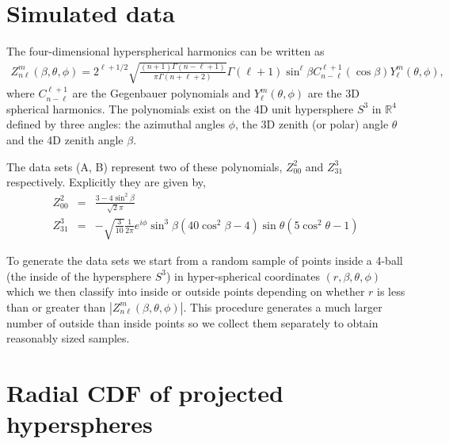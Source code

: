 \appendix

\section{Simulated data}

The  four-dimensional hyperspherical harmonics \cite{Domokos:1967fgx} can be written as
\begin{eqnarray}
Z^m_{n\ell}(\beta,\theta,\phi)=2^{\ell+1/2}\sqrt{\frac{(n+1)\Gamma(n-\ell+1)}{\pi\Gamma(n+\ell+2)}}
\Gamma(\ell+1)\sin^\ell\beta C^{\ell+1}_{n-\ell}(\cos\beta)Y^m_\ell(\theta,\phi),
\end{eqnarray}
where $C^{\ell+1}_{n-\ell}$ are the Gegenbauer polynomials and $Y^m_\ell(\theta,\phi)$ are the 3D spherical harmonics. The polynomials exist on the 4D unit hypersphere $S^3$ in $\mathbb{R}^4$ defined by three angles: the azimuthal angles $\phi$, the 3D zenith (or polar) angle $\theta$ and the 4D zenith angle $\beta$.

The data sets (A, B) represent two of these polynomials, $Z^2_{00}$ and $Z^3_{31}$ respectively. Explicitly they are given by,
\begin{eqnarray}
Z^2_{00} &=& \frac{3-4\sin^2\beta}{\sqrt{2}\pi} \nonumber \\
Z^3_{31} &=& -\sqrt{\frac{3}{10}}\frac{1}{2\pi} e^{i\phi}\sin^3\beta\left(40\cos^2\beta-4\right)\sin\theta\left(5\cos^2\theta-1\right)
\end{eqnarray}

To generate the data sets we start from a random sample of points inside a 4-ball (the inside of the hypersphere $S^3$) in hyper-spherical coordinates $(r,\beta,\theta,\phi)$ which we then classify into inside or outside points depending on whether $r$ is less than or greater than $|Z^m_{n\ell}(\beta,\theta,\phi)|$. This procedure generates a much larger number of outside than inside points so we collect them separately to obtain reasonably sized samples.



\section{Radial CDF of projected hyperspheres}

